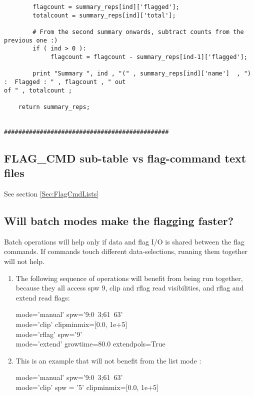 \begin{verbatim}
        flagcount = summary_reps[ind]['flagged'];
        totalcount = summary_reps[ind]['total'];
     
        # From the second summary onwards, subtract counts from the previous one :)
        if ( ind > 0 ):
             flagcount = flagcount - summary_reps[ind-1]['flagged'];

        print "Summary ", ind , "(" , summary_reps[ind]['name']  , ") :  Flagged : " , flagcount , " out 
of " , totalcount ;

    return summary_reps; 


##############################################

\end{verbatim}


\subsection{FLAG\_CMD sub-table vs flag-command text files}
See section \ref{Sec:FlagCmdLists}


\subsection{Will batch modes make the flagging faster?}

Batch operations will help only if data and flag I/O is shared between the flag commands.  
If commands touch different data-selections, running them together will not help.

\begin{enumerate}
\item The following sequence of operations will benefit from being run together, 
because they all access spw 9, clip and rflag read visibilities, and rflag and extend read flags:

mode='manual'  spw='9:0~3;61~63' \\
mode='clip'  clipminmix=[0.0, 1e+5] \\
mode='rflag'   spw='9' \\
mode='extend'  growtime=80.0   extendpols=True 

\item This is an example that will not benefit from the list mode : 

mode='manual'  spw='9:0~3;61~63' \\
mode='clip'  spw = '5'  clipminmix=[0.0, 1e+5] 

\end{enumerate}




